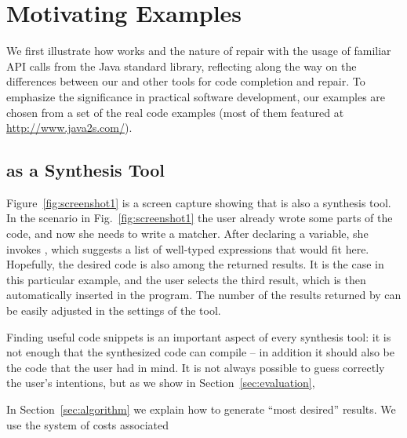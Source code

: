 \section{Motivating Examples}
\label{sec:examples}

We first illustrate how \ourTool works and the nature of repair with the usage of
familiar API calls from the Java standard library, reflecting along the way on the differences between our and other tools for code completion and repair. To emphasize the significance in practical software development, 
our examples are chosen from a set of the real code examples (most of them featured at
\url{http://www.java2s.com/}{}).

\subsection{\ourTool as a Synthesis Tool}

Figure~\ref{fig:screenshot1} is a screen capture showing that \ourTool is also
a synthesis tool. In the scenario in Fig.~\ref{fig:screenshot1} the user already wrote some parts of the code, and now she 
needs to write a matcher. After declaring a variable,
she invokes \ourTool, which suggests a list of well-typed expressions that would fit here. Hopefully, the desired code is also among the returned results. It is the case in this particular example, and the user selects the third 
result, which is then automatically inserted in the program. The number of the results returned by \ourTool can be easily adjusted in the settings of the tool. 

Finding useful code snippets is an important aspect of every synthesis tool: it is not enough that 
the synthesized code can compile -- in addition it should also be the code that the user had in mind. It is not always possible to guess correctly the user's intentions, but as we show in Section~\ref{sec:evaluation}, \ourTool 


In Section~\ref{sec:algorithm} we explain how to generate ``most desired'' results. We use
the system of costs associated 



%
%
%
%


